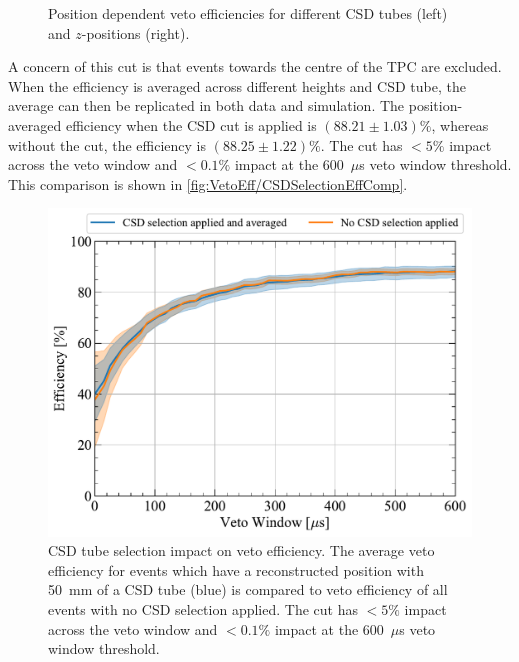 \begin{enumerate}
\begin{figure}[!ht]
\begin{subfigure}[b]{0.49\textwidth}
            \caption{}
    		\label{fig:VetoEff/VetoEffPositionDependenceCSD}
    	\end{subfigure}
    	\caption{Position dependent veto efficiencies for different CSD tubes (left) and $z$-positions (right).}
    	\label{fig:VetoEff/VetoEffPositionDependence}
    \end{figure}
	A concern of this cut is that events towards the centre of the TPC are excluded. When the efficiency is averaged across different heights and CSD tube, the average can then be replicated in both data and simulation. 
    The position-averaged efficiency when the CSD cut is applied is $(88.21\pm1.03)\%$, whereas without the cut, the efficiency is $(88.25\pm1.22)\%$.
	The cut has $<5\%$ impact across the veto window and $<0.1\%$ impact at the 600~$\mu$s veto window threshold. This comparison is shown in \autoref{fig:VetoEff/CSDSelectionEffComp}.
    \begin{figure}[!ht]
    	\centering
    	\includegraphics[width=0.7\linewidth]{figures/VetoEfficiency/CSDSelectionCheck.pdf}
    	\caption[CSD tube selection impact on veto efficiency.]{CSD tube selection impact on veto efficiency. The average veto efficiency for events which have a reconstructed position with 50~mm of a CSD tube (blue) is compared to veto efficiency of all events with no CSD selection applied. The cut has $<5\%$ impact across the veto window and $<0.1\%$ impact at the 600~$\mu$s veto window threshold.}
    	\label{fig:VetoEff/CSDSelectionEffComp}
    \end{figure}


\end{enumerate}
